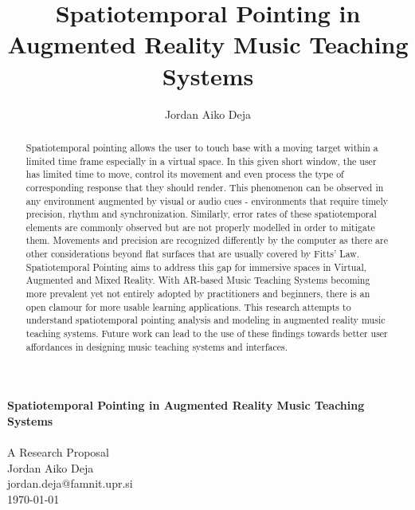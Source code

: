 \documentclass{article}
\title{Spatiotemporal Pointing in Augmented Reality Music Teaching Systems}
\author{Jordan Aiko Deja}
\begin{document}
\begin{center}
\large \textbf{Spatiotemporal Pointing in Augmented Reality Music Teaching Systems}
\\            
\vspace{0.5cm}\\
A Research Proposal\\
\vspace{0.5cm}
Jordan Aiko Deja\\
jordan.deja@famnit.upr.si\\
\vspace{0.5cm}
\today
\vspace{0.5cm}
\end{center}

\begin{abstract}
     Spatiotemporal pointing allows the user to touch base with a moving target within a limited time frame especially in a virtual space. In this given short window, the user has limited time to move, control its movement and even process the type of corresponding response that they should render. This phenomenon can be observed in any environment augmented by visual or audio cues - environments that require timely precision, rhythm and synchronization. Similarly, error rates of these spatiotemporal elements are commonly observed but are not properly modelled in order to mitigate them. Movements and precision are recognized differently by the computer as there are other considerations beyond flat surfaces that are usually covered by Fitts' Law. Spatiotemporal Pointing aims to address this gap for immersive spaces in Virtual, Augmented and Mixed Reality. With AR-based Music Teaching Systems becoming more prevalent yet not entirely adopted by practitioners and beginners, there is an open clamour for more usable learning applications. This research attempts to understand spatiotemporal pointing analysis and modeling in augmented reality music teaching systems. Future work can lead to the use of these findings towards better user affordances in designing music teaching systems and interfaces. 
\end{abstract}
\end{document}
